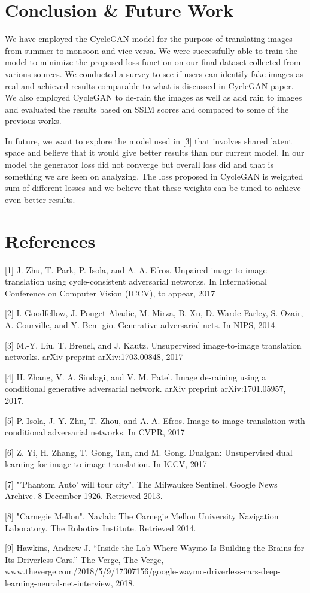 \documentclass{article}
\begin{document}
\section{Conclusion \& Future Work}

We have employed the CycleGAN model for the purpose of translating images from summer to monsoon and vice-versa. We were successfully able to train the model to minimize the proposed loss function on our final dataset collected from various sources. We conducted a survey to see if users can identify fake images as real and achieved results comparable to what is discussed in CycleGAN paper. We also employed CycleGAN to de-rain the images as well as add rain to images and evaluated the results based on SSIM scores and compared to some of the previous works.

In future, we want to explore the model used in [3] that involves shared latent space and believe that it would give better results than our current model. In our model the generator loss did not converge but overall loss did and that is something we are keen on analyzing. The loss proposed in CycleGAN is weighted sum of different losses and we believe that these weights can be tuned to achieve even better results.

\section*{References}

\small
\label{[1]}[1] J. Zhu, T. Park, P. Isola, and A. A. Efros. Unpaired image-to-image 
translation using cycle-consistent adversarial networks. 
In International Conference on Computer Vision (ICCV), to appear, 2017

\label{[2]}[2] I. Goodfellow, J. Pouget-Abadie, M. Mirza, B. Xu, D. Warde-Farley, 
S. Ozair, A. Courville, and Y. Ben- gio. Generative adversarial nets. 
In NIPS, 2014.

\label{[3]}[3] M.-Y. Liu, T. Breuel, and J. Kautz. Unsupervised 
image-to-image translation networks. arXiv preprint arXiv:1703.00848, 2017

\label{[4]}[4] H. Zhang, V. A. Sindagi, and V. M. Patel. Image de-raining using a conditional generative 
adversarial network. arXiv preprint arXiv:1701.05957, 2017.

\label{[5]}[5] P. Isola, J.-Y. Zhu, T. Zhou, and A. A. Efros. 
Image-to-image translation with conditional adversarial networks. 
In CVPR, 2017

\label{[6]}[6] Z. Yi, H. Zhang, T. Gong, Tan, and M. Gong. Dualgan: 
Unsupervised dual learning for image-to-image translation. 
In ICCV, 2017

\label{[7]}[7] "'Phantom Auto' will tour city". The Milwaukee Sentinel. 
Google News Archive. 8 December 1926. Retrieved 2013.

\label{[8]}[8] "Carnegie Mellon". Navlab: The Carnegie Mellon University Navigation Laboratory. 
The Robotics Institute. Retrieved 2014.

\label{[9]}[9] Hawkins, Andrew J. “Inside the Lab Where Waymo Is Building 
the Brains for Its Driverless Cars.” The Verge, The Verge, 
www.theverge.com/2018/5/9/17307156/google-waymo-driverless-cars-deep-learning-neural-net-interview, 2018.
\end{document}
